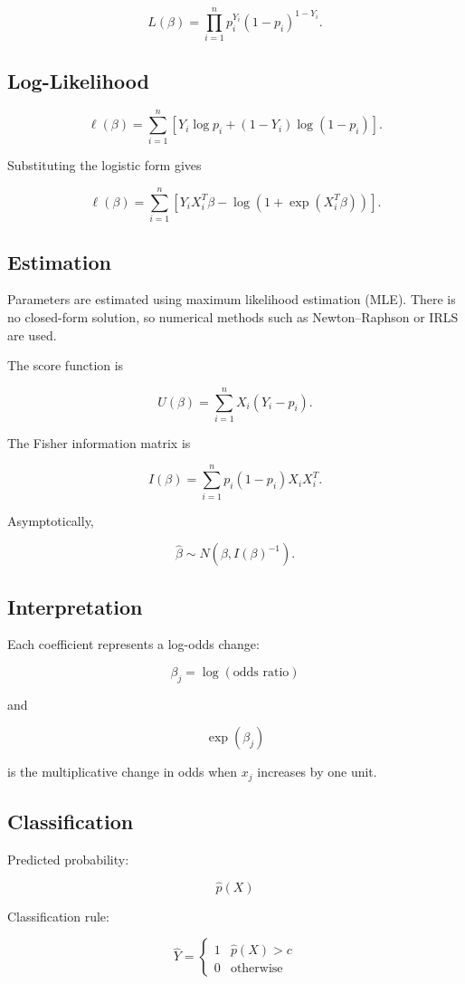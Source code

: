 \documentclass[a4paper,10pt]{article}
\begin{document}
\[
L(\beta)
=
\prod_{i=1}^n
p_i^{Y_i}(1-p_i)^{1-Y_i}.
\]

\subsection{Log-Likelihood}

\[
\ell(\beta)
=
\sum_{i=1}^n
\left[
Y_i \log p_i
+
(1-Y_i)\log(1-p_i)
\right].
\]

Substituting the logistic form gives

\[
\ell(\beta)
=
\sum_{i=1}^n
\left[
Y_i X_i^T\beta
-
\log(1+\exp(X_i^T\beta))
\right].
\]

\subsection{Estimation}

Parameters are estimated using maximum likelihood estimation (MLE).  
There is no closed-form solution, so numerical methods such as Newton–Raphson or IRLS are used.

The score function is

\[
U(\beta)
=
\sum_{i=1}^n
X_i(Y_i - p_i).
\]

The Fisher information matrix is

\[
I(\beta)
=
\sum_{i=1}^n
p_i(1-p_i) X_i X_i^T.
\]

Asymptotically,

\[
\hat{\beta}
\sim
N(\beta, I(\beta)^{-1}).
\]

\subsection{Interpretation}

Each coefficient represents a log-odds change:

\[
\beta_j
=
\log(\text{odds ratio})
\]

and

\[
\exp(\beta_j)
\]

is the multiplicative change in odds when $x_j$ increases by one unit.

\subsection{Classification}

Predicted probability:

\[
\hat p(X)
\]

Classification rule:

\[
\hat Y =
\begin{cases}
1 & \hat p(X) > c \\
0 & \text{otherwise}
\end{cases}
\]
\end{document}
